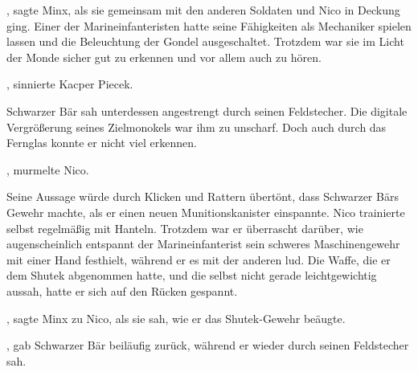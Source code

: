 , sagte Minx, als sie gemeinsam mit den anderen Soldaten und Nico in Deckung ging. Einer der Marineinfanteristen hatte seine Fähigkeiten als Mechaniker spielen lassen und die Beleuchtung der Gondel ausgeschaltet. Trotzdem war sie im Licht der Monde sicher gut zu erkennen und vor allem auch zu hören.

\par

, sinnierte Kacper Piecek. 

\par

Schwarzer Bär sah unterdessen angestrengt durch seinen Feldstecher. Die digitale Vergrößerung seines Zielmonokels war ihm zu unscharf. Doch auch durch das Fernglas konnte er nicht viel erkennen. 

\par

, murmelte Nico.

\par

Seine Aussage würde durch Klicken und Rattern übertönt, dass Schwarzer Bärs Gewehr machte, als er einen neuen Munitionskanister einspannte. Nico trainierte selbst regelmäßig mit Hanteln. Trotzdem war er überrascht darüber, wie augenscheinlich entspannt der Marineinfanterist sein schweres Maschinengewehr mit einer Hand festhielt, während er es mit der anderen lud. Die Waffe, die er dem Shutek abgenommen hatte, und die selbst nicht gerade leichtgewichtig aussah, hatte er sich auf den Rücken gespannt.

\par

, sagte Minx zu Nico, als sie sah, wie er das Shutek-Gewehr beäugte. 

\par

, gab Schwarzer Bär beiläufig zurück, während er wieder durch seinen Feldstecher sah.

